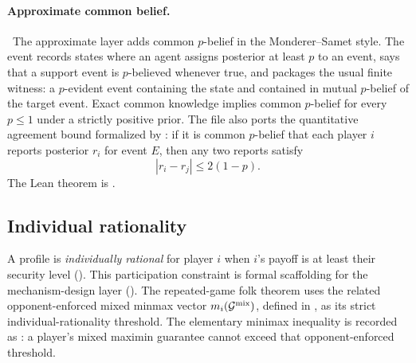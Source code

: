 \paragraph{Approximate common belief.}\
The approximate layer  adds
common $p$-belief in the Monderer--Samet style.  The event
 records states where an agent assigns posterior at
least $p$ to an event,  says that a support event is
$p$-believed whenever true, and \TT{CommonPBeliefAt} packages the
usual finite witness: a $p$-evident event containing the state and
contained in mutual $p$-belief of the target event.  Exact common
knowledge implies common $p$-belief for every $p \le 1$ under a
strictly positive prior.  The file also ports the quantitative
agreement bound formalized by
\citet{ChenEtAl2026AgreeDisagreeFormal}: if it is common $p$-belief
that each player $i$ reports posterior $r_i$ for event $E$, then
any two reports satisfy
\[
  |r_i - r_j| \le 2(1-p).
\]
The Lean theorem is
.


\subsection{Individual rationality}
\label{sec:solution-concepts:ir}

A profile is \emph{individually rational} for player $i$ when $i$'s
payoff is at least their security level
().  This participation
constraint is formal scaffolding for the mechanism-design layer
().  The repeated-game folk theorem uses
the related opponent-enforced mixed minmax vector
$m_i(\mathcal{G}^{\mathrm{mix}})$, defined in , as
its strict individual-rationality threshold.  The elementary minimax
inequality is recorded as
: a player's mixed
maximin guarantee cannot exceed that opponent-enforced threshold.

